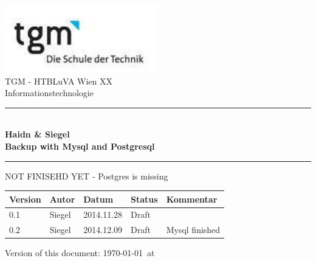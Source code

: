 \documentclass[10pt]{article}
\begin{document}
\begin{titlepage}
\begin{center}

\includegraphics[width=0.5\textwidth]{pictures/logo}\\  

\LARGE TGM - HTBLuVA Wien XX \\ Informationstechnologie  \\[1.5cm]

\rule{14cm}{1mm}
{ \huge \bfseries \\[0.4cm]  \huge Haidn \& Siegel \\ \LARGE Backup with Mysql and Postgresql \\[0.4cm] }

\rule{14cm}{1mm}
\noindent 

\vspace{2cm}

 \LARGE NOT FINISEHD YET - Postgres is missing
  \vspace{5cm}

\small
\begin{center}
  \begin{tabular}{ | p{} | p{} | p{} | p{} | p{} |}
    \hline
\textbf{Version} & \textbf{Autor} & \textbf{Datum} & \textbf{Status} & \textbf{Kommentar} \\ 
    \hline 
    \hline
0.1 & Siegel & 2014.11.28 & Draft &    \\ 
0.2 & Siegel & 2014.12.09 & Draft &  Mysql finished  \\ 

    \hline
  \end{tabular}
\end{center}

\vfill

{\small Version of this document: \today ~at  \thistime    }
\end{center}

\end{titlepage}
\end{document}
